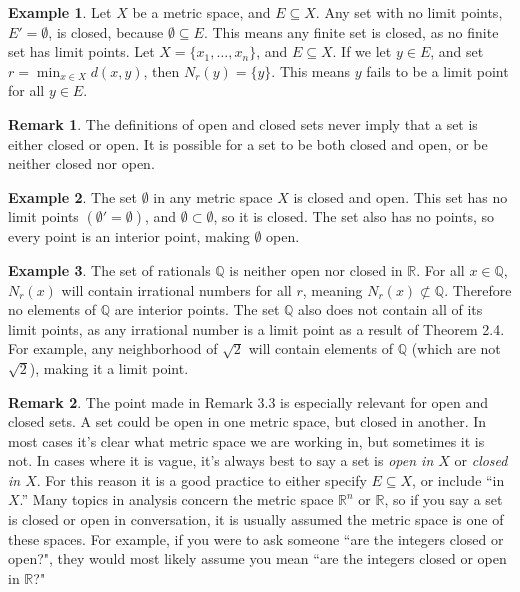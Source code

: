 \documentclass{article}
\newcommand{\R}{\mathbb{R}}
\newcommand{\Q}{\mathbb{Q}}
\theoremstyle{definition}
\newtheorem{example}{Example}[section]
\newtheorem{remark}{Remark}[section]
\begin{document}
\begin{example}
Let $ X $ be a metric space, and $ E\subseteq X $. Any set with no limit points, $ E'=\emptyset $, is closed, because $ \emptyset\subseteq E $. This means any finite set is closed, as no finite set has limit points. Let $ X=\{x_1,\ldots, x_n\} $, and $ E\subseteq X $. If we let $ y\in E $, and set $ r=\min_{x\in X}d(x,y) $, then $ N_r(y)=\{y\} $. This means $ y $ fails to be a limit point for all $ y\in E $.
\end{example}
\begin{remark}
	The definitions of open and closed sets never imply that a set is either closed or open. It is possible for a set to be both closed and open, or be neither closed nor open.
\end{remark}
\begin{example}
The set $ \emptyset $ in any metric space $ X $ is closed and open. This set has no limit points $ (\emptyset'=\emptyset) $, and $ \emptyset\subset\emptyset $, so it is closed. The set also has no points, so every point is an interior point, making $ \emptyset $ open. 
\end{example}
\begin{example}
The set of rationals $ \Q $ is neither open nor closed in $ \R $. For all $ x\in\Q $, $ N_r(x) $ will contain irrational numbers for all $ r $, meaning $ N_r(x)\not\subset\Q $. Therefore no elements of $ \Q $ are interior points. The set $ \Q $ also does not contain all of its limit points, as any irrational number is a limit point as a result of Theorem 2.4. For example, any neighborhood of $ \sqrt{2} $ will contain elements of $ \Q $ (which are not $ \sqrt{2} $), making it a limit point. 
\end{example}
\begin{remark}
	The point made in Remark 3.3 is especially relevant for open and closed sets. A set could be open in one metric space, but closed in another. In most cases it's clear what metric space we are working in, but sometimes it is not. In cases where it is vague, it's always best to say a set is \textit{open in $ X $} or \textit{closed in $ X $}. For this reason it is a good practice to either specify $ E\subseteq X $, or include ``in $ X $.'' Many topics in analysis concern the metric space $ \R^n $ or $ \R $, so if you say a set is closed or open in conversation, it is usually assumed the metric space is one of these spaces. For example, if you were to ask someone ``are the integers closed or open?", they would most likely assume you mean ``are the integers closed or open in $ \R $?" 
\end{remark}
\end{document}
